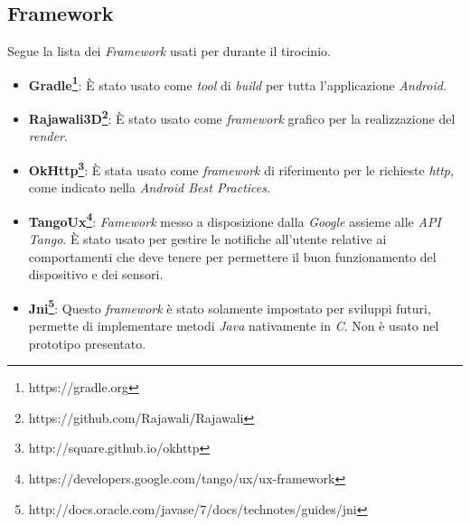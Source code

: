 \subsection{Framework}
Segue la lista dei \emph{Framework} usati per durante il tirocinio.
\begin{itemize}
	\item \textbf{Gradle\footnote{https://gradle.org}}: È stato usato come \emph{tool} di \emph{build} per tutta l'applicazione \emph{Android}.
	\item \textbf{Rajawali3D\footnote{https://github.com/Rajawali/Rajawali}}: È stato usato come \emph{framework} grafico per la realizzazione del \emph{render}.
	\item \textbf{OkHttp\footnote{http://square.github.io/okhttp}}: È stata usato come \emph{framework} di riferimento per le richieste \emph{http}, come indicato nella \emph{Android Best Practices}.
	\item \textbf{TangoUx\footnote{https://developers.google.com/tango/ux/ux-framework}}: \emph{Famework} messo a disposizione dalla \emph{Google} assieme alle \emph{API Tango}. È stato usato per gestire le notifiche all'utente relative ai comportamenti che deve tenere per permettere il buon funzionamento del dispositivo e dei sensori.
	\item \textbf{Jni\footnote{http://docs.oracle.com/javase/7/docs/technotes/guides/jni}}: Questo \emph{framework} è stato solamente impostato per sviluppi futuri, permette di implementare metodi \emph{Java} nativamente in \emph{C}. Non è usato nel prototipo presentato.
\end{itemize}












